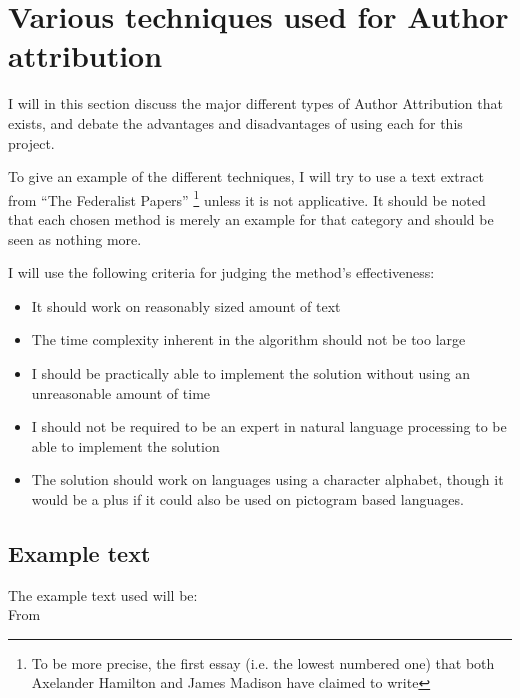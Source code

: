 \section{Various techniques used for Author attribution}
\label{choiceMethod}
I will in this section discuss the major different types of Author Attribution that exists, and debate the advantages and disadvantages of using each for this project.

To give an example of the different techniques, I will try to use a text extract from ``The Federalist Papers'' \cite{federalist} \footnote{To be more precise, the first essay (i.e. the lowest numbered one) that both Axelander Hamilton and James Madison have claimed to write} unless it is not applicative. It should be noted that each chosen method is merely an example for that category and should be seen as nothing more.

I will use the following criteria for judging the method's effectiveness:
\begin{itemize}
\item It should work on reasonably sized amount of text
\item The time complexity inherent in the algorithm should not be too large
\item I should be practically able to implement the solution without using an unreasonable amount of time
\item I should not be required to be an expert in natural language processing to be able to implement the solution
\item The solution should work on languages using a character alphabet, though it would be a plus if it could also be used on pictogram based languages.
\end{itemize}

\subsection{Example text}
The example text used will be:\\
From \cite{federalist}

